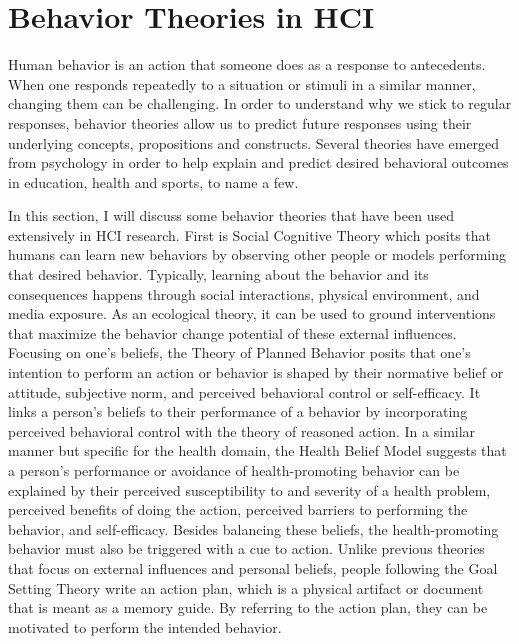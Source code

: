 \section{Behavior Theories in HCI}
Human behavior is an action that someone does as a response to antecedents\cite{davis2015theories}. When one responds repeatedly to a situation or stimuli in a similar manner, changing them can be challenging. In order to understand why we stick to regular responses, behavior theories allow us to predict future responses using their underlying concepts, propositions and constructs\cite{glanz2008health}. Several theories have emerged from psychology in order to help explain and predict desired behavioral outcomes in education, health and sports, to name a few.

In this section, I will discuss some behavior theories that have been used extensively in HCI research\cite{hekler2013mind}. First is Social Cognitive Theory which posits that humans can learn new behaviors by observing other people or models performing that desired behavior\cite{bandura2001social}. Typically, learning about the behavior and its consequences happens through social interactions, physical environment, and media exposure. As an ecological theory, it can be used to ground interventions that maximize the behavior change potential of these external influences. Focusing on one's beliefs, the Theory of Planned Behavior posits that one's intention to perform an action or behavior is shaped by their normative belief or attitude, subjective norm, and perceived behavioral control or self-efficacy\cite{ajzen1985intentions}. It links a person's beliefs to their performance of a behavior by incorporating perceived behavioral control with the theory of reasoned action. In a similar manner but specific for the health domain, the Health Belief Model suggests that a person's performance or avoidance of health-promoting behavior can be explained by their perceived susceptibility to and severity of a health problem, perceived benefits of doing the action, perceived barriers to performing the behavior, and self-efficacy\cite{prochaska1983stages,rosenstock1974health}. Besides balancing these beliefs, the health-promoting behavior must also be triggered with a cue to action. Unlike previous theories that focus on external influences and personal beliefs, people following the Goal Setting Theory write an action plan, which is a physical artifact or document that is meant as a memory guide. By referring to the action plan, they can be motivated to perform the intended behavior\cite{locke2002building}. 

